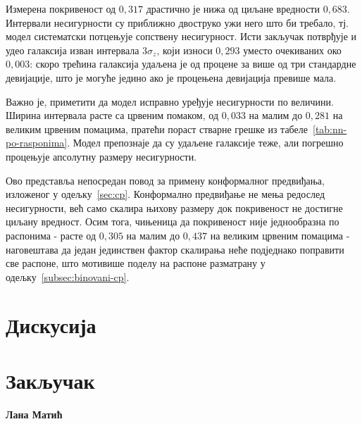 \documentclass[12pt,oneside]{memoir}
\newcommand{\sigz}{\sigma_z}
\begin{document}
Измерена покривеност од $0{,}317$ драстично је нижа од циљане вредности
$0{,}683$. Интервали несигурности су приближно двоструко ужи него
што би требало, тј. модел систематски потцењује сопствену несигурност. Исти
закључак потврђује и удео галаксија изван интервала $3\sigz$, који износи
$0{,}293$ уместо очекиваних око $0{,}003$: скоро трећина галаксија удаљена је
од процене за више од три стандардне девијације, што је могуће једино ако је
процењена девијација превише мала.
 
Важно је, приметити да модел исправно уређује несигурности по
величини. Ширина интервала расте са црвеним помаком, од $0{,}033$ на малим
до $0{,}281$ на великим црвеним помацима, пратећи пораст стварне грешке из
табеле~\ref{tab:nn-po-rasponima}. Модел препознаје да су удаљене
галаксије теже, али погрешно процењује апсолутну размеру несигурности.
 
Ово представља непосредан повод за примену конформалног предвиђања,
изложеног у одељку~\ref{sec:cp}. Конформално предвиђање не мења редослед
несигурности, већ само скалира њихову размеру док покривеност не достигне
циљану вредност. Осим тога, чињеница да покривеност није једнообразна по
распонима - расте од $0{,}305$ на малим до $0{,}437$ на великим црвеним
помацима - наговештава да један јединствен фактор скалирања неће подједнако
поправити све распоне, што мотивише поделу на распоне разматрану у
одељку~\ref{subsec:binovani-cp}.


\chapter{Дискусија}

\chapter{Закључак}


\nocite{*}
\literatura

\backmatter

\begin{biografija}
\textbf{Лана Матић}
\end{biografija}
\end{document}
